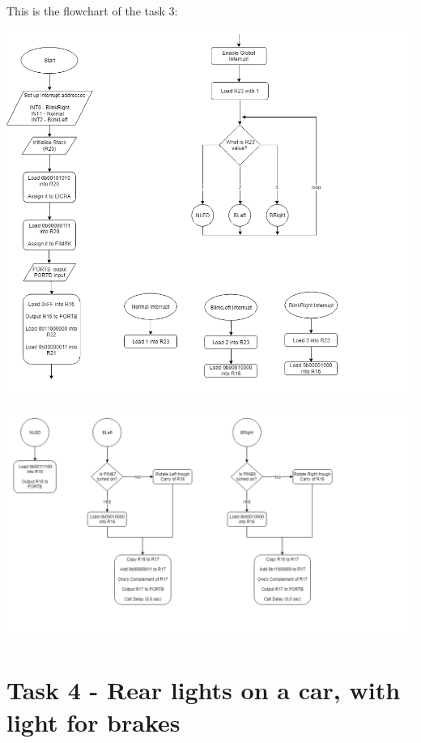 \documentclass[a4paper,12pt]{article}
\begin{document}
\newpage
This is the flowchart of the task 3:
\begin{center}
\includegraphics[scale=1]{img/TASK3-1.png}
\end{center}
\begin{center}
\includegraphics[scale=0.9]{img/TASK3-2.png}
\end{center}

\newpage
\section{Task 4 - Rear lights on a car, with light for brakes}
\end{document}
